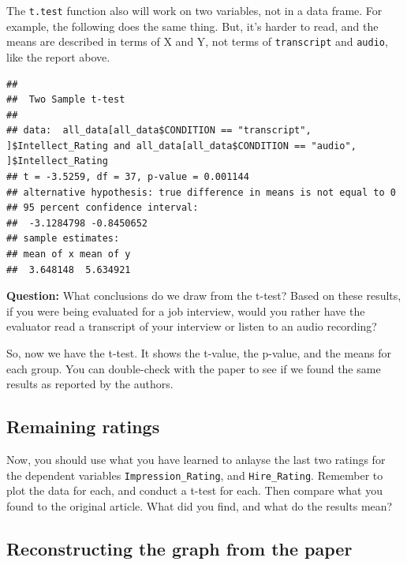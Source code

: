 \documentclass[]{book}
\newenvironment{Shaded}{\begin{snugshade}}{\end{snugshade}}
\newcommand{\KeywordTok}[1]{\textcolor[rgb]{0.13,0.29,0.53}{\textbf{{#1}}}}
\newcommand{\DataTypeTok}[1]{\textcolor[rgb]{0.13,0.29,0.53}{{#1}}}
\newcommand{\StringTok}[1]{\textcolor[rgb]{0.31,0.60,0.02}{{#1}}}
\newcommand{\NormalTok}[1]{{#1}}
\theoremstyle{definition}
\theoremstyle{definition}
\theoremstyle{definition}
\theoremstyle{remark}
\begin{document}
The \texttt{t.test} function also will work on two variables, not in a
data frame. For example, the following does the same thing. But, it's
harder to read, and the means are described in terms of X and Y, not
terms of \texttt{transcript} and \texttt{audio}, like the report above.

\begin{Shaded}
\end{Shaded}

\begin{verbatim}
## 
##  Two Sample t-test
## 
## data:  all_data[all_data$CONDITION == "transcript", ]$Intellect_Rating and all_data[all_data$CONDITION == "audio", ]$Intellect_Rating
## t = -3.5259, df = 37, p-value = 0.001144
## alternative hypothesis: true difference in means is not equal to 0
## 95 percent confidence interval:
##  -3.1284798 -0.8450652
## sample estimates:
## mean of x mean of y 
##  3.648148  5.634921
\end{verbatim}

\textbf{Question:} What conclusions do we draw from the t-test? Based on
these results, if you were being evaluated for a job interview, would
you rather have the evaluator read a transcript of your interview or
listen to an audio recording?

So, now we have the t-test. It shows the t-value, the p-value, and the
means for each group. You can double-check with the paper to see if we
found the same results as reported by the authors.

\subsection{Remaining ratings}\label{remaining-ratings}

Now, you should use what you have learned to anlayse the last two
ratings for the dependent variables \texttt{Impression\_Rating}, and
\texttt{Hire\_Rating}. Remember to plot the data for each, and conduct a
t-test for each. Then compare what you found to the original article.
What did you find, and what do the results mean?

\subsection{Reconstructing the graph from the
paper}\label{reconstructing-the-graph-from-the-paper}
\end{document}
